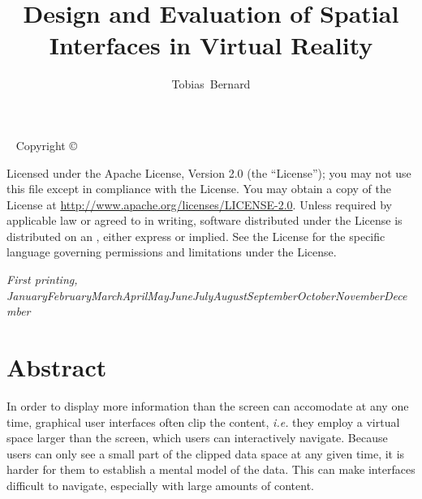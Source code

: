 \documentclass[nobib]{tufte-book} %
\title{Design and Evaluation of Spatial Interfaces in Virtual Reality} %
\author[Tobias Bernard]{Tobias\ Bernard} %
\newcommand{\monthyear}{\ifcase\month\or January\or February\or March\or April\or May\or June\or July\or August\or September\or October\or November\or December\fi\space\number\year} %
\newcommand{\hairsp}{\hspace{1pt}} %
\newcommand{\ie}{\textit{i.\hairsp{}e.}\xspace} %
\begin{document}
\frontmatter



\maketitlepage %


\newpage
\begin{fullwidth}
~\vfill
\thispagestyle{empty}
\setlength{\parindent}{0pt}
\setlength{\parskip}{\baselineskip}
Copyright \copyright\ \the\year\ \thanklessauthor

\par{}

\par{}

\par Licensed under the Apache License, Version 2.0 (the ``License''); you may not use this file except in compliance with the License. You may obtain a copy of the License at \url{http://www.apache.org/licenses/LICENSE-2.0}. Unless required by applicable law or agreed to in writing, software distributed under the License is distributed on an , either express or implied. See the License for the specific language governing permissions and limitations under the License.

\par\textit{First printing, \monthyear}
\end{fullwidth}


\tableofcontents %


\mainmatter


\chapter{Abstract}

In order to display more information than the screen can accomodate at any one time, graphical user interfaces often clip the content, \ie they employ a virtual space larger than the screen, which users can interactively navigate. Because users can only see a small part of the clipped data space at any given time, it is harder for them to establish a mental model of the data. This can make interfaces difficult to navigate, especially with large amounts of content.
\end{document}
